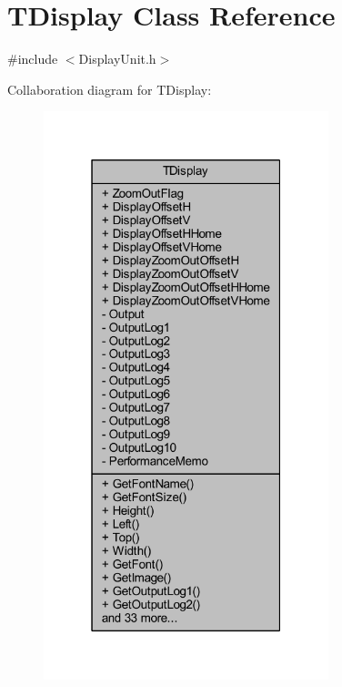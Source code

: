 \hypertarget{class_t_display}{}\section{T\+Display Class Reference}
\label{class_t_display}


{\ttfamily \#include $<$Display\+Unit.\+h$>$}



Collaboration diagram for T\+Display\+:
\nopagebreak
\begin{figure}[H]
\begin{center}
\leavevmode
\includegraphics[width=235pt]{class_t_display__coll__graph}
\end{center}
\end{figure}
